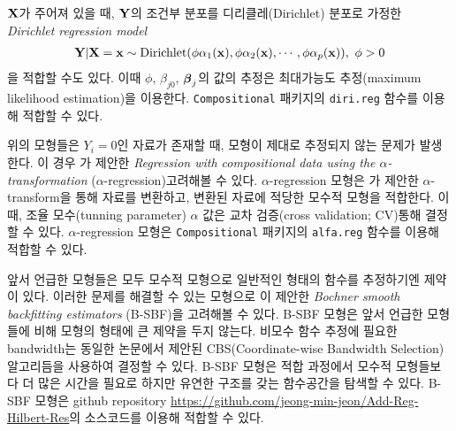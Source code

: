 $\mathbf{X}$가 주어져 있을 때, $\mathbf{Y}$의 조건부 분포를 디리클레(Dirichlet) 분포로 가정한 \textit{Dirichlet regression model}
\begin{equation}\label{eqn:dirireg}
    \begin{gathered}
        \mathbf{Y}|\mathbf{X}=\mathbf{x} \sim \text{Dirichlet}(\phi \alpha_1(\mathbf{x}), \phi \alpha_2(\mathbf{x}),\cdots, \phi \alpha_p(\mathbf{x})),~\phi > 0
    \end{gathered}
\end{equation}
을 적합할 수도 있다. 이때 $\phi$, $\beta_{j0}$, $\boldsymbol{\beta}_j$의 값의 추정은 최대가능도 추정(maximum likelihood estimation)을 이용한다. \texttt{Compositional} 패키지의 \texttt{diri.reg} 함수를 이용해 적합할 수 있다.

위의 모형들은 $Y_i=0$인 자료가 존재할 때, 모형이 제대로 추정되지 않는 문제가 발생한다. 이 경우 \citet{tsagris2015regression}가 제안한 \textit{Regression with compositional data using the $\alpha$-transformation} ($\alpha$-regression)\를 고려해볼 수 있다. $\alpha$-regression 모형은 \citet{tsagris2011data}가 제안한 $\alpha$-transform을 통해 자료를 변환하고, 변환된 자료에 적당한 모수적 모형을 적합한다. 이때, 조율 모수(tunning parameter) $\alpha$ 값은 교차 검증(cross validation; CV)\을 통해 결정할 수 있다. $\alpha$-regression 모형은 \texttt{Compositional} 패키지의 \texttt{alfa.reg} 함수를 이용해 적합할 수 있다.

앞서 언급한 모형들은 모두 모수적 모형으로 일반적인 형태의 함수를 추정하기엔 제약이 있다. 이러한 문제를 해결할 수 있는 모형으로 \citet{jeon2018additive}이 제안한 \textit{Bochner smooth backfitting estimators} (B-SBF)을 고려해볼 수 있다. B-SBF 모형은 앞서 언급한 모형들에 비해 모형의 형태에 큰 제약을 두지 않는다. 비모수 함수 추정에 필요한 bandwidth는 동일한 논문에서 제안된 CBS(Coordinate-wise Bandwidth Selection) 알고리듬을 사용하여 결정할 수 있다. B-SBF 모형은 적합 과정에서 모수적 모형들보다 더 많은 시간을 필요로 하지만 유연한 구조를 갖는 함수공간을 탐색할 수 있다. B-SBF 모형은 github repository \url{https://github.com/jeong-min-jeon/Add-Reg-Hilbert-Res}의 소스코드를 이용해 적합할 수 있다.